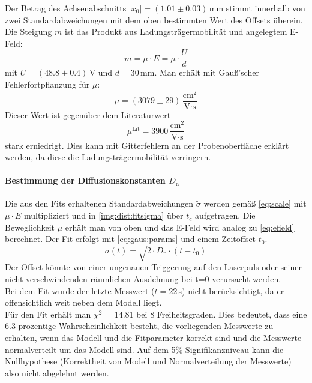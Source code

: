 Der Betrag des Achsenabschnitts $|x_0| = (1.01 \pm 0.03)$\,mm stimmt innerhalb von zwei Standardabweichungen mit dem oben bestimmten Wert des 
Offsets überein.\\
Die Steigung $m$ ist das Produkt aus Ladungsträgermobilität und angelegtem E-Feld:
\begin{equation}
  \label{eq:efield}
  m = \mu \cdot E = \mu \cdot \frac{U}{d}
\end{equation}
mit $U = (48.8 \pm 0.4)$\,V und $d=30$\,mm. Man erhält mit Gauß'scher Fehlerfortpflanzung für $\mu$:
\begin{equation}
  \mu = (3079 \pm 29)\,\frac{\text{cm}^2}{\text{V} \cdot \text{s}}
\end{equation}
Dieser Wert ist gegenüber dem Literaturwert
\begin{equation}
  \mu^{\text{Lit}} = 3900\,\frac{\text{cm}^2}{\text{V} \cdot \text{s}}
\end{equation}
stark erniedrigt. Dies kann mit Gitterfehlern an der Probenoberfläche erklärt werden, da diese die Ladungsträgermobilität verringern.

\paragraph{Bestimmung der Diffusionskonstanten $D_\text{n}$}
Die aus den Fits erhaltenen Standardabweichungen $\tilde{\sigma}$ werden gemäß \autoref{eq:scale} mit $\mu \cdot E$ multipliziert und 
in \autoref{img:dist:fitsigma} über $t_c$ aufgetragen. Die Beweglichkeit $\mu$ erhält man von oben und das E-Feld wird analog zu \autoref{eq:efield} berechnet.
Der Fit erfolgt mit \autoref{eq:gaus:params} und einem Zeitoffset $t_0$.
\begin{equation}
  \sigma(t) = \sqrt{2 \cdot D_\text{n} \cdot (t-t_0)}
\end{equation}
Der Offset könnte von einer ungenauen Triggerung auf den Laserpuls oder seiner nicht verschwindenden räumlichen Ausdehnung
bei t=0 verursacht werden. \\
Bei dem Fit wurde der letzte Messwert ($t=22$\,\textmu s) nicht berücksichtigt, da er offensichtlich weit neben dem Modell liegt.\\
Für den Fit erhält man $\chi ^2$ = 14.81 bei 8 Freiheitsgraden.
Dies bedeutet, dass eine 6.3-prozentige Wahrscheinlichkeit besteht,
die vorliegenden Messwerte zu erhalten,
wenn das Modell und die Fitparameter korrekt sind und die Messwerte normalverteilt um das Modell sind.
Auf dem 5\%-Signifikanzniveau kann die Nullhypothese (Korrektheit von Modell und Normalverteilung der Messwerte)
also nicht abgelehnt werden.

